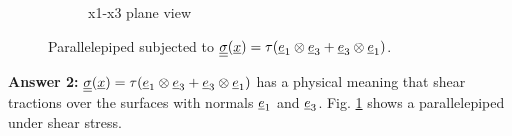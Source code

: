 \documentclass[letter,12pt]{article}
\begin{document}
\begin{figure}[ht]
\begin{subfigure}{.45\textwidth}
		\caption{x1-x3 plane view}
	\end{subfigure}	
	\caption{Parallelepiped subjected to $\underline{\underline{\sigma}} (\underline{x}) = \tau (\underline{e}_1 \otimes \underline{e}_3 + \underline{e}_3 \otimes \underline{e}_1 )$.}
	\label{fig:replacewithrealfigure2}
\end{figure}


\noindent \textbf{Answer 2:}  $\underline{\underline{\sigma}} (\underline{x}) = \tau (\underline{e}_1 \otimes \underline{e}_3 + \underline{e}_3 \otimes \underline{e}_1 )$ has a physical meaning that shear tractions over the surfaces with normals $\underline{e}_1$ and $\underline{e}_3$. Fig. \ref{fig:replacewithrealfigure2} shows a parallelepiped under shear stress. \\
\end{document}
